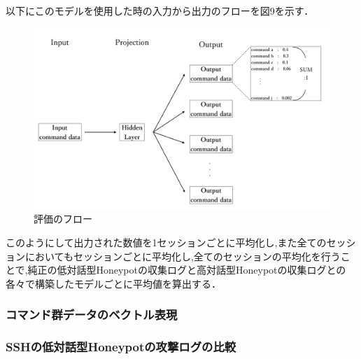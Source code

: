 以下にこのモデルを使用した時の入力から出力のフローを図9を示す．

\begin{figure}[H]
    \centering
    \includegraphics[width=1.0\textwidth]{figures/evalflow.png}
    \caption{評価のフロー\cite{word2vecpaper}\cite{word2vecpaper2}}
    \label{fig:evo}
\end{figure}

このようにして出力された数値を1セッションごとに平均化し,また全てのセッションにおいてもセッションごとに平均化し,全てのセッションの平均化を行うことで,純正の低対話型Honeypotの収集ログと高対話型Honeypotの収集ログとの各々で構築したモデルごとに平均値を算出する．


\subsubsection{コマンド群データのベクトル表現}
\label{evaluation:CommandVector}

\subsubsection{SSHの低対話型Honeypotの攻撃ログの比較}
\label{evaluation:CompareLog}



